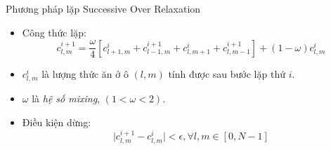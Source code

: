 \begin{frame}{Phương pháp lặp Successive Over Relaxation}
\begin{itemize}
    \item Công thức lặp:
    \begin{equation}
    	c^{i + 1}_{l, m} = \frac{\omega}{4}[c^{i}_{l + 1, m} + c^{i + 1}_{l - 1, m} + c^{i}_{l, m + 1} + c^{i + 1}_{l, m - 1}] + (1 - \omega)c^{i}_{l, m}
	\end{equation}
	\item $c^{i}_{l, m}$ là lượng thức ăn ở ô $(l, m)$ tính được sau bước lặp thứ $i$.
	\item $\omega$ là \emph{hệ số mixing}, $(1 < \omega < 2)$.
	\item Điều kiện dừng:
	\begin{equation}
    	\mid c^{i + 1}_{l, m} - c^{i}_{l, m} \mid < \epsilon, \forall l, m \in [0, N - 1]
	\end{equation}
\end{itemize}
\end{frame}